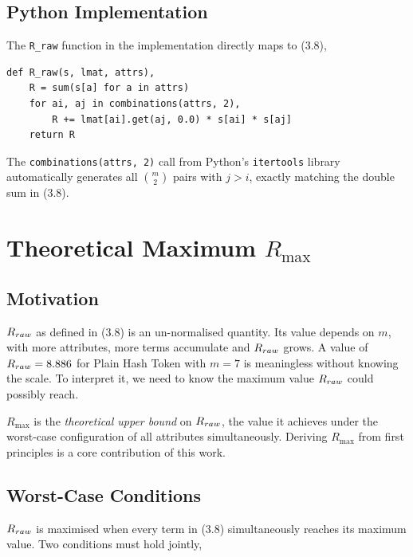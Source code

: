 \subsection{Python Implementation}

The \texttt{R\_raw} function in the implementation
directly maps to (3.8),

\begin{lstlisting}
def R_raw(s, lmat, attrs),
    R = sum(s[a] for a in attrs)
    for ai, aj in combinations(attrs, 2),
        R += lmat[ai].get(aj, 0.0) * s[ai] * s[aj]
    return R
\end{lstlisting}

The \texttt{combinations(attrs, 2)} call from Python's
\texttt{itertools} library automatically generates all
$\binom{m}{2}$ pairs with $j > i$, exactly matching the
double sum in (3.8).

\section{Theoretical Maximum \texorpdfstring{$R_{\mathrm{max}}$}{R\_max}}
\label{sec:r_max}

\subsection{Motivation}

$R_{raw}$ as defined in (3.8) is an
un-normalised quantity. Its value depends on $m$, with
more attributes, more terms accumulate and $R_{raw}$ grows.
A value of $R_{raw} = 8.886$ for Plain Hash Token with
$m = 7$ is meaningless without knowing the scale.
To interpret it, we need to know the maximum value
$R_{raw}$ could possibly reach.

$R_{\mathrm{max}}$ is the \textit{theoretical upper bound}
on $R_{raw}$, the value it achieves under the
worst-case configuration of all attributes simultaneously.
Deriving $R_{\mathrm{max}}$ from first principles is a
core contribution of this work.

\subsection{Worst-Case Conditions}

$R_{raw}$ is maximised when every term in
(3.8) simultaneously reaches its
maximum value. Two conditions must hold jointly,

